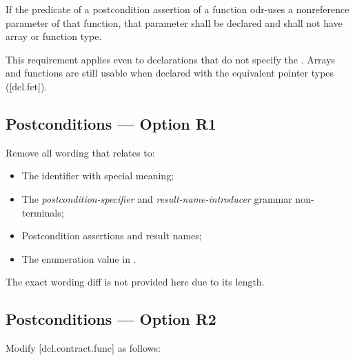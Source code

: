 \begin{adjustwidth}{0.5cm}{0.5cm}
 If the predicate of a postcondition assertion of a function odr-uses a non\-reference parameter of that function, that parameter shall be declared  and shall not have array or function type. 
\begin{note}
This requirement applies even to declarations
that do not specify the . Arrays and functions are still usable when declared with the equivalent pointer types ([dcl.fct]).
\end{note}
\begin{example}
\tcode{[...]}
\end{example}
\end{adjustwidth}

\subsection*{Postconditions --- Option R1}

Remove all wording that relates to:
\begin{itemize}
\item The  identifier with special meaning;
\item The \emph{postcondition-specifier} and \emph{result-name-introducer} grammar non-terminals;
\item Postcondition assertions and result names;
\item The  enumeration value in .
\end{itemize}
The exact wording diff is not provided here due to its length.

\subsection*{Postconditions --- Option R2}

Modify [dcl.contract.func] as follows:

